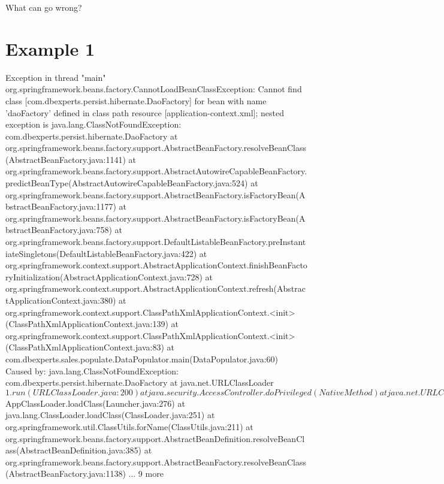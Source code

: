 What can go wrong?
\section{Example 1}
Exception in thread "main" org.springframework.beans.factory.CannotLoadBeanClassException: Cannot find class [com.dbexperts.persist.hibernate.DaoFactory] for bean with name 'daoFactory' defined in class path resource [application-context.xml]; nested exception is java.lang.ClassNotFoundException: com.dbexperts.persist.hibernate.DaoFactory
	at org.springframework.beans.factory.support.AbstractBeanFactory.resolveBeanClass(AbstractBeanFactory.java:1141)
	at org.springframework.beans.factory.support.AbstractAutowireCapableBeanFactory.predictBeanType(AbstractAutowireCapableBeanFactory.java:524)
	at org.springframework.beans.factory.support.AbstractBeanFactory.isFactoryBean(AbstractBeanFactory.java:1177)
	at org.springframework.beans.factory.support.AbstractBeanFactory.isFactoryBean(AbstractBeanFactory.java:758)
	at org.springframework.beans.factory.support.DefaultListableBeanFactory.preInstantiateSingletons(DefaultListableBeanFactory.java:422)
	at org.springframework.context.support.AbstractApplicationContext.finishBeanFactoryInitialization(AbstractApplicationContext.java:728)
	at org.springframework.context.support.AbstractApplicationContext.refresh(AbstractApplicationContext.java:380)
	at org.springframework.context.support.ClassPathXmlApplicationContext.<init>(ClassPathXmlApplicationContext.java:139)
	at org.springframework.context.support.ClassPathXmlApplicationContext.<init>(ClassPathXmlApplicationContext.java:83)
	at com.dbexperts.sales.populate.DataPopulator.main(DataPopulator.java:60)
Caused by: java.lang.ClassNotFoundException: com.dbexperts.persist.hibernate.DaoFactory
	at java.net.URLClassLoader$1.run(URLClassLoader.java:200)
	at java.security.AccessController.doPrivileged(Native Method)
	at java.net.URLClassLoader.findClass(URLClassLoader.java:188)
	at java.lang.ClassLoader.loadClass(ClassLoader.java:306)
	at sun.misc.Launcher$AppClassLoader.loadClass(Launcher.java:276)
	at java.lang.ClassLoader.loadClass(ClassLoader.java:251)
	at org.springframework.util.ClassUtils.forName(ClassUtils.java:211)
	at org.springframework.beans.factory.support.AbstractBeanDefinition.resolveBeanClass(AbstractBeanDefinition.java:385)
	at org.springframework.beans.factory.support.AbstractBeanFactory.resolveBeanClass(AbstractBeanFactory.java:1138)
	... 9 more
